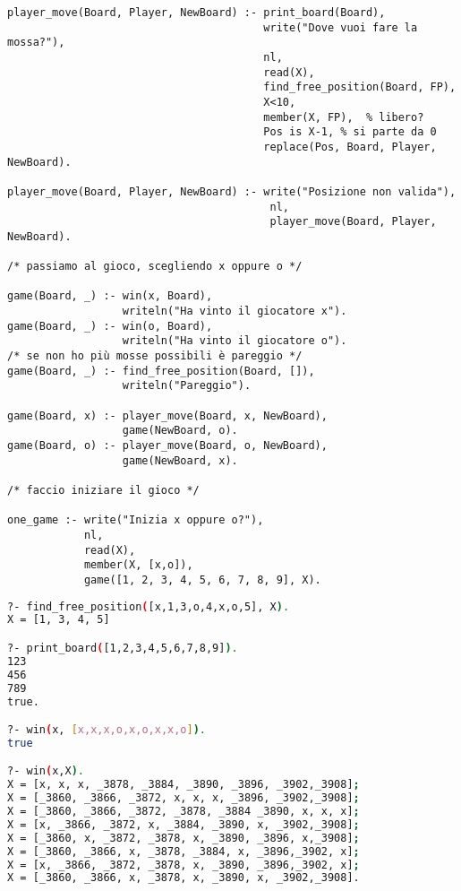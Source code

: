 \documentclass[a4paper,12pt, oneside]{book}
\begin{document}
\begin{esercizio}
\begin{verbatim}
player_move(Board, Player, NewBoard) :- print_board(Board),
                                        write("Dove vuoi fare la mossa?"),
                                        nl,
                                        read(X),
                                        find_free_position(Board, FP),
                                        X<10,
                                        member(X, FP),  % libero?
                                        Pos is X-1, % si parte da 0
                                        replace(Pos, Board, Player, NewBoard).

player_move(Board, Player, NewBoard) :- write("Posizione non valida"),
                                         nl,
                                         player_move(Board, Player, NewBoard).

/* passiamo al gioco, scegliendo x oppure o */

game(Board, _) :- win(x, Board),
                  writeln("Ha vinto il giocatore x").
game(Board, _) :- win(o, Board),
                  writeln("Ha vinto il giocatore o").
/* se non ho più mosse possibili è pareggio */
game(Board, _) :- find_free_position(Board, []),
                  writeln("Pareggio").

game(Board, x) :- player_move(Board, x, NewBoard),
                  game(NewBoard, o).
game(Board, o) :- player_move(Board, o, NewBoard),
                  game(NewBoard, x).

/* faccio iniziare il gioco */

one_game :- write("Inizia x oppure o?"),
            nl,
            read(X),
            member(X, [x,o]),
            game([1, 2, 3, 4, 5, 6, 7, 8, 9], X).
\end{verbatim}

\begin{shaded}
\begin{lstlisting}[language=bash]
?- find_free_position([x,1,3,o,4,x,o,5], X).
X = [1, 3, 4, 5] 

?- print_board([1,2,3,4,5,6,7,8,9]).
123
456
789
true.

?- win(x, [x,x,x,o,x,o,x,x,o]).
true 

?- win(x,X).
X = [x, x, x, _3878, _3884, _3890, _3896, _3902,_3908];
X = [_3860, _3866, _3872, x, x, x, _3896, _3902,_3908];
X = [_3860, _3866, _3872, _3878, _3884 _3890, x, x, x];
X = [x, _3866, _3872, x, _3884, _3890, x, _3902,_3908];
X = [_3860, x, _3872, _3878, x, _3890, _3896, x,_3908];
X = [_3860, _3866, x, _3878, _3884, x, _3896,_3902, x];
X = [x, _3866, _3872, _3878, x, _3890, _3896,_3902, x];
X = [_3860, _3866, x, _3878, x, _3890, x, _3902,_3908].


\end{lstlisting}
\end{shaded}
\end{esercizio}
\end{document}
